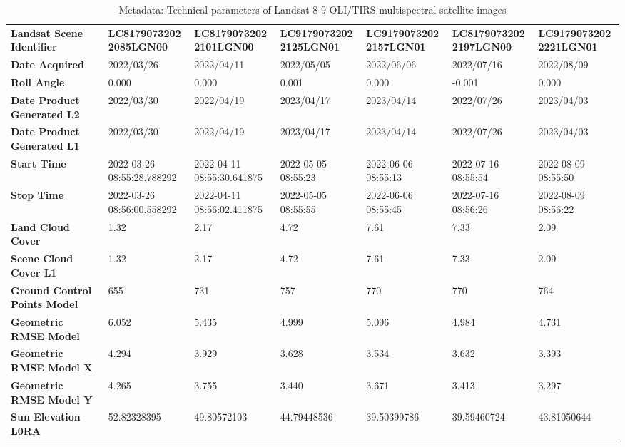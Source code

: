 \documentclass[climate,article,submit,pdftex,moreauthors]{Definitions/mdpi}
\begin{document}
\begin{landscape}
\begin{table}
\caption{Metadata: Technical parameters of Landsat 8-9 OLI/TIRS multispectral satellite images}
 \label{tab01}
\footnotesize
\setlength\tabcolsep{2pt}
\begin{tabular}{|l|l|l|l|l|l|l|}    
      	\textbf{Landsat Scene Identifier} & \textbf{LC81790732022085LGN00} & \textbf{LC81790732022101LGN00} & \textbf{LC91790732022125LGN01} & \textbf{LC91790732022157LGN01} & \textbf{LC81790732022197LGN00} & \textbf{LC91790732022221LGN01} \\
        \textbf{Date Acquired} & 2022/03/26 & 2022/04/11 & 2022/05/05 & 2022/06/06 & 2022/07/16 & 2022/08/09 \\
        \textbf{Roll Angle} & 0.000 & 0.000 & 0.001 & 0.000 & -0.001 & 0.000 \\
        \textbf{Date Product Generated L2} & 2022/03/30 & 2022/04/19 & 2023/04/17 & 2023/04/14 & 2022/07/26 & 2023/04/03 \\
        \textbf{Date Product Generated L1} & 2022/03/30 & 2022/04/19 & 2023/04/17 & 2023/04/14 & 2022/07/26 & 2023/04/03 \\
        \textbf{Start Time} & 2022-03-26 08:55:28.788292 & 2022-04-11 08:55:30.641875 & 2022-05-05 08:55:23 & 2022-06-06 08:55:13 & 2022-07-16 08:55:54 & 2022-08-09 08:55:50 \\
        \textbf{Stop Time} & 2022-03-26 08:56:00.558292 & 2022-04-11 08:56:02.411875 & 2022-05-05 08:55:55 & 2022-06-06 08:55:45 & 2022-07-16 08:56:26 & 2022-08-09 08:56:22 \\
        \textbf{Land Cloud Cover} & 1.32 & 2.17 & 4.72 & 7.61 & 7.33 & 2.09 \\
        \textbf{Scene Cloud Cover L1} & 1.32 & 2.17 & 4.72 & 7.61 & 7.33 & 2.09 \\
        \textbf{Ground Control Points Model} & 655 & 731 & 757 & 770 & 770 & 764 \\
        \textbf{Geometric RMSE Model} & 6.052 & 5.435 & 4.999 & 5.096 & 4.984 & 4.731 \\
        \textbf{Geometric RMSE Model X} & 4.294 & 3.929 & 3.628 & 3.534 & 3.632 & 3.393 \\
        \textbf{Geometric RMSE Model Y} & 4.265 & 3.755 & 3.440 & 3.671 & 3.413 & 3.297 \\
        \textbf{Sun Elevation L0RA} & 52.82328395 & 49.80572103 & 44.79448536 & 39.50399786 & 39.59460724 & 43.81050644 \\

\end{tabular}
\end{table}
\end{landscape}
\end{document}
